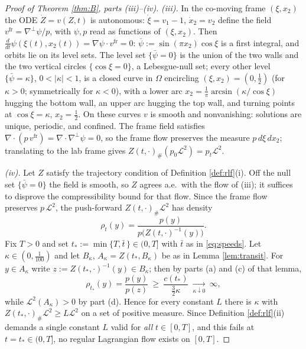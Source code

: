 \documentclass[11pt]{amsart}
\theoremstyle{definition}
\newcommand{\LL}[1]{\mathcal{L}^{#1}}
\newcommand{\dive}{\nabla\!\cdot}
\newcommand{\dd}{\,d}
\begin{document}
\begin{proof}[Proof of Theorem \ref{thm:B}, parts (iii)--(iv)]
\emph{(iii).} In the co-moving frame $(\xi,x_2)$ the ODE $\dot
Z=v(Z,t)$ is autonomous: $\dot\xi=v_1-1$, $\dot x_2=v_2$ define the
field $v^{\mathrm{fr}}=\nabla^\perp\psi/p$, with $\psi,p$ read as
functions of $(\xi,x_2)$. Then
$\tfrac{d}{dt}\psi(\xi(t),x_2(t))=\nabla\psi\cdot
v^{\mathrm{fr}}=0$: $\bar\psi:=\sin(\pi x_2)\cos\xi$ is a first
integral, and orbits lie on its level sets. The level set
$\{\bar\psi=0\}$ is the union of the two walls and the two vertical
circles $\{\cos\xi=0\}$, a Lebesgue-null set; every other level
$\{\bar\psi=\kappa\}$, $0<|\kappa|<1$, is a closed curve in $\Omega$
encircling $(\xi,x_2)=(0,\tfrac12)$ (for $\kappa>0$; symmetrically
for $\kappa<0$), with a lower arc
$x_2=\tfrac1\pi\arcsin(\kappa/\cos\xi)$ hugging the bottom wall, an
upper arc hugging the top wall, and turning points at
$\cos\xi=\kappa$, $x_2=\tfrac12$. On these curves $v$ is smooth and
nonvanishing: solutions are unique, periodic, and confined. The frame
field satisfies $\dive(p\,v^{\mathrm{fr}})=\dive\nabla^\perp\psi=0$,
so the frame flow preserves the measure $p\dd\xi\dd x_2$;
translating to the lab frame gives
$Z(t,\cdot)_\#(p_0\LL{2})=p_t\LL{2}$.

\emph{(iv).} Let $Z$ satisfy the trajectory condition of Definition
\ref{def:rlf}(i). Off the null set $\{\bar\psi=0\}$ the field is
smooth, so $Z$ agrees a.e.\ with the flow of (iii); it suffices to
disprove the compressibility bound for that flow. Since the frame
flow preserves $p\,\LL{2}$, the push-forward
$Z(t,\cdot)_\#\LL{2}$ has density
\[
\rho_t(y)=\frac{p(y)}{p\big(Z(t,\cdot)^{-1}(y)\big)} .
\]
Fix $T>0$ and set $t_*:=\min\{T,\bar t\,\}\in(0,T]$ with $\bar t$ as
in \eqref{eq:speeds}. Let $\kappa\in(0,\tfrac1{100})$ and let
$B_\kappa$, $A_\kappa=Z(t_*,B_\kappa)$ be as in Lemma
\ref{lem:transit}. For $y\in A_\kappa$ write $z:=Z(t_*,\cdot)^{-1}(y)
\in B_\kappa$; then by parts (a) and (c) of that lemma,
\[
\rho_{t_*}(y)=\frac{p(y)}{p(z)}
\ \ge\ \frac{c(t_*)}{\tfrac32\kappa}
\ \xrightarrow[\kappa\downarrow0]{}\ \infty ,
\]
while $\LL{2}(A_\kappa)>0$ by part (d). Hence for every constant $L$
there is $\kappa$ with $Z(t_*,\cdot)_\#\LL{2}\ge L\LL{2}$ on a set
of positive measure. Since Definition \ref{def:rlf}(ii) demands a
single constant $L$ valid for \emph{all} $t\in[0,T]$, and this fails
at $t=t_*\in(0,T]$, no regular Lagrangian flow exists on $[0,T]$.
\end{proof}
\end{document}
